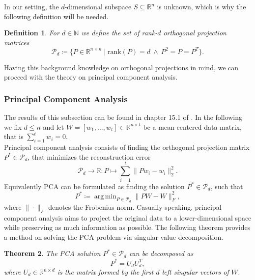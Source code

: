 \documentclass[11pt, a4paper]{article}
\newtheorem{theorem}{Theorem}[section]
\newtheorem{definition}[theorem]{Definition}
\newcommand{\N}{\mathds{N}}
\newcommand{\R}{\mathds{R}}
\renewcommand{\P}{\mathcal{P}}
\DeclareMathOperator*{\argmin}{arg\,min}
\begin{document}
In our setting, the $d$-dimensional subspace $S \subseteq \R^n$ is unknown, which is why the following definition will be needed.

\begin{definition}
For $d \in \N$ we define the set of rank-$d$ orthogonal projection matrices
\[ \P_d \coloneq \Big \{ P \in \R^{n \times n} \mid \text{rank}(P) = d \ \wedge \ P^2 = P = P^T \Big \}. \]
\end{definition}

Having this background knowledge on orthogonal projections in mind, we can proceed with the theory on principal component analysis.

\subsubsection{Principal Component Analysis} \label{sec:PCA}

The results of this subsection can be found in chapter 15.1 of \cite{PCA}. In the following we fix $d \leq n$ and let $W = [w_1, \dots, w_t] \in \R^{n \times t}$ be a mean-centered data matrix, that is $\sum_{i=1}^{t}w_i=0$. \\

Principal component analysis consists of finding the orthogonal projection matrix $P^* \in \P_d$, that minimizes the reconstruction error
\[ \P_d \to \R : P \mapsto \sum_{i=1}^{t} \big \| Pw_i - w_i \big \|_2^2. \]
Equivalently PCA can be formulated as finding the solution $P^* \in \P_d$, such that
\[ P^* \coloneq \argmin_{P \in \P_d} \big \| PW - W \big \|_F^2, \]
where $\| \cdot \|_F$ denotes the Frobenius norm. Casually speaking, principal component analysis aims to project the original data to a lower-dimensional space while preserving as much information as possible. The following theorem provides a method on solving the PCA problem via singular value decomposition.

\begin{theorem} \label{thm:PCA}
The PCA solution $P^* \in \P_d$ can be decomposed as
\[ P^* = U_dU_d^T, \]
where $U_d \in \R^{n \times d}$ is the matrix formed by the first $d$ left singular vectors of $W$.
\end{theorem}
\end{document}
